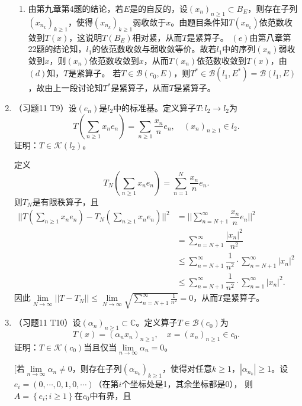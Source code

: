 \begin{enumerate}
\begin{answer}
\begin{enumerate}
        \item 由第九章第4题的结论，若$E$是的自反的，设$(x_n)_{n\geqslant 1}\subset B_E$，则存在子列$(x_{n_k})_{k\geqslant 1}$，使得$(x_{n_k})_{k\geqslant1}$弱收敛于$x$。由题目条件知$T(x_{n_k})$依范数收敛到$T(x)$，这说明$T(B_E)$相对紧，从而$T$是紧算子。
        $(e)$由第八章第22题的结论知，$l_1$的依范数收敛与弱收敛等价。故若$l_1$中的序列$(x_n)$弱收敛到$x$，则$(x_n)$依范数收敛到$x$，从而$T(x_n)$依范数收敛到$T(x)$，由$(d)$知，$T$是紧算子。 
        若$T\in \mathcal{B}(c_0,E)$，则$T^*\in \mathcal{B}(l_1,E^*)=\mathcal{B}(l_1,E)$，故由上一段讨论知$T^*$是紧算子，从而$T$是紧算子。
      \end{enumerate}
    \end{answer}
  \item （习题11 T9）设$(e_n)$是$l_2$中的标准基。定义算子$T:l_2\rightarrow l_2$为
  \[T(\sum_{n\geqslant 1}x_n e_n)=\sum_{n\geqslant 1}\dfrac{x_n}{n}e_n,\quad (x_n)_{n\geqslant 1}\in l_2.\]
  证明：$T\in \mathcal{K}(l_2)$。 
    \begin{answer}
      定义
      \[T_N(\sum_{n\geqslant 1}x_n e_n)=\sum_{n=1}^{N}\dfrac{x_n}{n}e_n.\]
      则$T_N$是有限秩算子，且
      \[\begin{aligned}
        ||T(\sum_{n\geqslant 1}x_n e_n)-T_N (\sum_{n\geqslant 1}x_n e_n)||^2&=||\sum_{n=N+1}^{\infty}\dfrac{x_n}{n}e_n||^2\\
                &=\sum_{n=N+1}^\infty \dfrac{|x_n|^2}{n^2}\\
                &\leqslant \sum_{n=N+1}^\infty \dfrac{1}{n^2}\cdot\sum_{n=N+1}^\infty |x_n|^2\\
                &\leqslant \sum_{n=N+1}^\infty \dfrac{1}{n^2}\cdot \sum_{n=1}^\infty |x_n|^2.
      \end{aligned}\] 
      因此$\lim\limits_{N\rightarrow \infty}||T-T_N||\leqslant\lim\limits_{N\rightarrow \infty} \sqrt{\sum_{n=N+1}^\infty \frac{1}{n^2}}=0$，从而$T$是紧算子。
    \end{answer}
  \item （习题11 T10）设$(\alpha_n)_{n\geqslant 1}\subset\mathbb{C}$。定义算子$T\in \mathcal{B}(c_0)$为
  \[T(x)=(\alpha_n x_n)_{n\geqslant1},\quad x=(x_n)_{n\geqslant 1}\in c_0.\]
  证明：$T\in \mathcal{K}(c_0)$当且仅当$\lim\limits_{n\rightarrow \infty}\alpha_n=0$。
    \begin{answer}[][若$\lim\limits_{n\rightarrow \infty} \alpha_n\not=0$，则存在子列$(\alpha_{n_k})_{k\geqslant 1}$，使得对任意$k\geqslant 1$，$|\alpha_{n_k}|\geqslant 1$。设$e_i=(0,\cdots,0,1,0,\cdots)$（在第$i$个坐标处是1，其余坐标都是0）， 则$A=\left\{ e_i;i\geqslant 1\right\}$在$c_0$中有界，且

\end{answer}
\end{enumerate}
